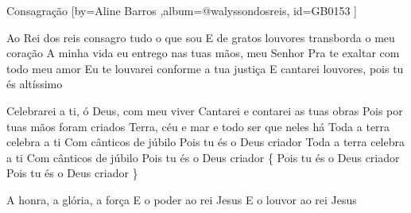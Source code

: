 \beginsong
{Consagração %
}[by={Aline Barros %
},album={@walyssondosreis},
id={GB0153 %
}] 

\beginverse*
Ao Rei dos reis consagro tudo o que sou
E de gratos louvores transborda o meu coração
A minha vida eu entrego nas tuas mãos, meu Senhor
Pra te exaltar com todo meu amor
Eu te louvarei conforme a tua justiça
E cantarei louvores, pois tu és altíssimo
\endverse

\beginverse*
Celebrarei a ti, ó Deus, com meu viver
Cantarei e contarei as tuas obras
Pois por tuas mãos foram criados
Terra, céu e mar e todo ser que neles há
Toda a terra celebra a ti
Com cânticos de júbilo
Pois tu és o Deus criador
Toda a terra celebra a ti
Com cânticos de júbilo
Pois tu és o Deus criador
\{ Pois tu és o Deus criador
Pois tu és o Deus criador \}
\endverse

\beginchorus
A honra, a glória, a força
E o poder ao rei Jesus
E o louvor ao rei Jesus
\endchorus
\begin{comment}
\lstset{basicstyle=\scriptsize\bf} %
\tab{Solo 1}
\begin{lstlisting}
E|-----------------------------------------------------|
B|-----------------------------------------------------|
G|-----------------------------------------------------|
D|-----------------------------------------------------|
A|-----------------------------------------------------|
E|-----------------------------------------------------|
\end{lstlisting}
\end{comment}
\vspace{2em}
%
%
% 
% 
\endsong
\begin{comment}

\end{comment}